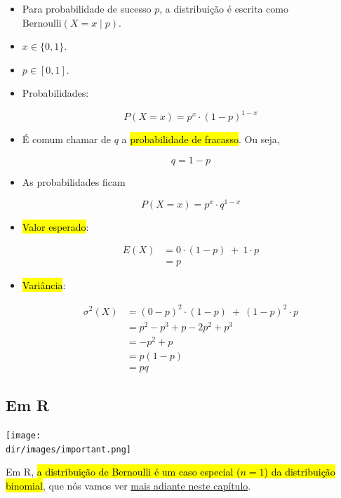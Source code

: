 \documentclass[
  11pt]{report}
\newcommand{\dir}{/ssd/R/x86_64-pc-linux-gnu-library/4.3/fnaufelRmd/rmarkdown/resources}
\newenvironment{rmdimportant}
{
  \begin{myimportant}
    \texttt{[image: \\dir/images/important.png]}
    \tcblower
  }
  {
  \end{myimportant}
}
\begin{document}
\begin{itemize}
\item
  Para probabilidade de sucesso $p$, a distribuição é escrita como $\text{Bernoulli}(X = x \mid p)$.
\item
  $x \in \{0, 1\}$.
\item
  $p \in [0, 1]$.
\item
  Probabilidades:

  \[
  P(X = x) = p^x \cdot (1 - p)^{1 - x}
  \]
\item
  É comum chamar de $q$ a {\hl{probabilidade de fracasso}}. Ou seja,

  \[
  q = 1 - p
  \]
\item
  As probabilidades ficam

  \[
  P(X = x) = p^x \cdot q^{1 - x}
  \]
\item
  {\hl{Valor esperado}}:

  \[
  \begin{aligned}
  E(X) &= 0 \cdot (1 - p) \;+\: 1 \cdot p \\
       &= p
  \end{aligned}
  \]
\item
  {\hl{Variância}}:

  \[
  \begin{aligned}
  \sigma^2(X) &= (0 - p)^2 \cdot (1 - p) \;+\: (1 - p)^2 \cdot p \\
       &= p^2 - p^3 + p - 2p^2 + p^3 \\
       &= -p^2 + p \\
       &= p(1 - p) \\
       &= pq
  \end{aligned}
  \]
\end{itemize}

\hypertarget{em-r-1}{%
\subsection{Em R}\label{em-r-1}}

\begin{rmdimportant}
Em R, {\hl{a distribuição de Bernoulli é um caso especial ($n = 1$) da distribuição binomial}}, que nós vamos ver \protect\hyperlink{binom}{mais adiante neste capítulo}.

\end{rmdimportant}
\end{document}
